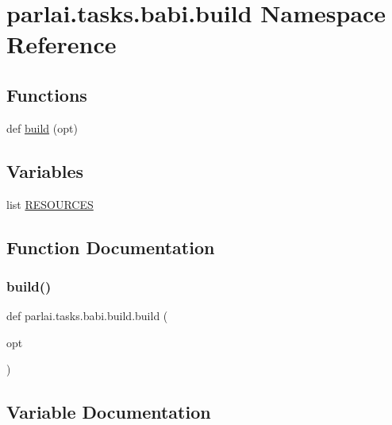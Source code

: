 \hypertarget{namespaceparlai_1_1tasks_1_1babi_1_1build}{}\section{parlai.\+tasks.\+babi.\+build Namespace Reference}
\label{namespaceparlai_1_1tasks_1_1babi_1_1build}
\subsection*{Functions}
\begin{DoxyCompactItemize}
\item 
def \hyperlink{namespaceparlai_1_1tasks_1_1babi_1_1build_a24b76b74415839eb5c7fa1233fbface4}{build} (opt)
\end{DoxyCompactItemize}
\subsection*{Variables}
\begin{DoxyCompactItemize}
\item 
list \hyperlink{namespaceparlai_1_1tasks_1_1babi_1_1build_ad43c8fefdd636b159033010bba7395f1}{R\+E\+S\+O\+U\+R\+C\+ES}
\end{DoxyCompactItemize}


\subsection{Function Documentation}
\mbox{\label{namespaceparlai_1_1tasks_1_1babi_1_1build_a24b76b74415839eb5c7fa1233fbface4}} 
\subsubsection{\texorpdfstring{build()}{build()}}
{\footnotesize\ttfamily def parlai.\+tasks.\+babi.\+build.\+build (\begin{DoxyParamCaption}\item[{}]{opt }\end{DoxyParamCaption})}



\subsection{Variable Documentation}
\mbox{\label{namespaceparlai_1_1tasks_1_1babi_1_1build_ad43c8fefdd636b159033010bba7395f1}} 
